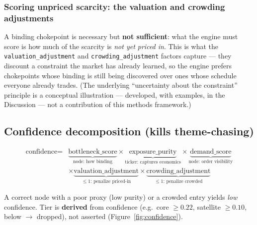 \documentclass[11pt]{article}
\begin{document}
\subsubsection*{Scoring unpriced scarcity: the valuation and crowding adjustments}

A binding chokepoint is necessary but \textbf{not sufficient}: what the engine must score is how much
of the scarcity is \emph{not yet priced in}. This is what the \texttt{valuation\_adjustment} and
\texttt{crowding\_adjustment} factors capture --- they discount a constraint the market has already
learned, so the engine prefers chokepoints whose binding is still being discovered over ones whose
schedule everyone already trades. (The underlying ``uncertainty about the constraint'' principle is a
conceptual illustration --- developed, with examples, in the Discussion --- not a contribution of this
methods framework.)

\subsection{Confidence decomposition (kills theme-chasing)}

\[
\begin{aligned}
\text{confidence} = {}&\underbrace{\text{bottleneck\_score}}_{\text{node: how binding}}
  \times \underbrace{\text{exposure\_purity}}_{\text{ticker: captures economics}}
  \times \underbrace{\text{demand\_score}}_{\text{node: order visibility}} \\
  &\times \underbrace{\text{valuation\_adjustment}}_{\le 1\text{: penalize priced-in}}
  \times \underbrace{\text{crowding\_adjustment}}_{\le 1\text{: penalize crowded}}
\end{aligned}
\]

A correct node with a poor proxy (low purity) or a crowded entry yields \emph{low} confidence.
Tier is \textbf{derived} from confidence (e.g.\ core $\geq 0.22$, satellite $\geq 0.10$, below
$\to$ dropped), not asserted (Figure~\ref{fig:confidence}).
\end{document}

